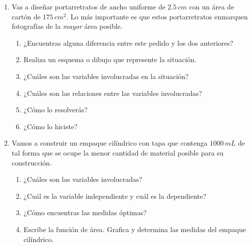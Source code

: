 \documentclass[letterpaper,11pt]{article}
\begin{document}
\begin{enumerate}
\item Vas a diseñar portarretratos de ancho uniforme de $2.5 \, cm$ con un área de cartón de $175\,cm^2$. Lo más importante es que estos portarretratos enmarquen fotografías de la \textit{mayor} área posible.

    \begin{enumerate}
        \item ¿Encuentras alguna diferencia entre este pedido y los dos anteriores?
        \item Realiza un esquema o dibujo que represente la situación.
        \item ¿Cuáles son las variables involucradas en la situación?
        \item ¿Cuáles son las relaciones entre las variables involucradas?
        \item ¿Cómo lo resolverás?
        \item ¿Cómo lo hiciste?
    \end{enumerate}

\item Vamos a construir un empaque cilíndrico con tapa que contenga $1000 \, mL$ de tal forma que se ocupe la menor cantidad de material posible para su construcción.
    
    \begin{enumerate}
        \item ¿Cuáles son las variables involucradas?
        \item ¿Cuál es la variable independiente y cuál es la dependiente?
        \item ¿Cómo encuentras las medidas óptimas?
        \item Escribe la función de área. Grafica y determina las medidas del empaque cilíndrico.
    \end{enumerate}
        
\end{enumerate}
\end{document}
